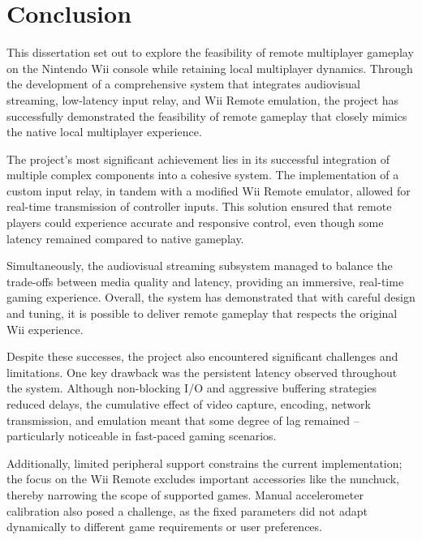 \chapter{Conclusion}
\label{chapter:conclusion}

This dissertation set out to explore the feasibility of remote multiplayer
gameplay on the Nintendo Wii console while retaining local multiplayer dynamics.
Through the development of a comprehensive system that integrates audiovisual
streaming, low-latency input relay, and Wii Remote emulation, the project has
successfully demonstrated the feasibility of remote gameplay that closely mimics
the native local multiplayer experience.

The project’s most significant achievement lies in its successful integration of
multiple complex components into a cohesive system. The implementation of a
custom input relay, in tandem with a modified Wii Remote emulator, allowed for
real-time transmission of controller inputs. This solution ensured that remote
players could experience accurate and responsive control, even though some
latency remained compared to native gameplay.

Simultaneously, the audiovisual
streaming subsystem managed to balance the trade-offs between media quality and
latency, providing an immersive, real-time gaming experience. Overall, the
system has demonstrated that with careful design and tuning, it is possible to
deliver remote gameplay that respects the original Wii experience.

Despite these successes, the project also encountered significant challenges and
limitations. One key drawback was the persistent latency observed throughout the
system. Although non-blocking I/O and aggressive buffering strategies reduced
delays, the cumulative effect of video capture, encoding, network transmission,
and emulation meant that some degree of lag remained -- particularly noticeable
in fast-paced gaming scenarios.

Additionally, limited peripheral support
constrains the current implementation; the focus on the Wii Remote excludes
important accessories like the nunchuck, thereby narrowing the scope of
supported games. Manual accelerometer calibration also posed a challenge, as the
fixed parameters did not adapt dynamically to different game requirements or
user preferences.


